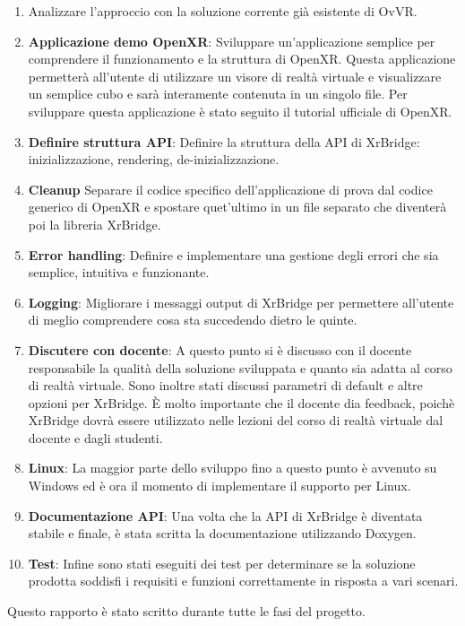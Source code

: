 \documentclass[twoside]{supsistudent}
\begin{document}
\begin{enumerate}
  \item Analizzare l'approccio con la soluzione corrente già esistente di OvVR.
  \item \textbf{Applicazione demo OpenXR}: Sviluppare un'applicazione semplice per comprendere il funzionamento e la struttura di OpenXR. Questa applicazione permetterà all'utente di utilizzare un visore di realtà virtuale e visualizzare un semplice cubo e sarà interamente contenuta in un singolo file. Per sviluppare questa applicazione è stato seguito il tutorial ufficiale di OpenXR.
  \item \textbf{Definire struttura API}: Definire la struttura della API di XrBridge: inizializzazione, rendering, de-inizializzazione.
  \item \textbf{Cleanup} Separare il codice specifico dell'applicazione di prova dal codice generico di OpenXR e spostare quet'ultimo in un file separato che diventerà poi la libreria XrBridge.
  \item \textbf{Error handling}: Definire e implementare una gestione degli errori che sia semplice, intuitiva e funzionante.
  \item \textbf{Logging}: Migliorare i messaggi output di XrBridge per permettere all'utente di meglio comprendere cosa sta succedendo dietro le quinte.
  \item \textbf{Discutere con docente}: A questo punto si è discusso con il docente responsabile la qualità della soluzione sviluppata e quanto sia adatta al corso di realtà virtuale. Sono inoltre stati discussi parametri di default e altre opzioni per XrBridge. È molto importante che il docente dia feedback, poichè XrBridge dovrà essere utilizzato nelle lezioni del corso di realtà virtuale dal docente e dagli studenti.
  \item \textbf{Linux}: La maggior parte dello sviluppo fino a questo punto è avvenuto su Windows ed è ora il momento di implementare il supporto per Linux.
  \item \textbf{Documentazione API}: Una volta che la API di XrBridge è diventata stabile e finale, è stata scritta la documentazione utilizzando Doxygen.
  \item \textbf{Test}: Infine sono stati eseguiti dei test per determinare se la soluzione prodotta soddisfi i requisiti e funzioni correttamente in risposta a vari scenari.
\end{enumerate}

Questo rapporto è stato scritto durante tutte le fasi del progetto.
\end{document}
